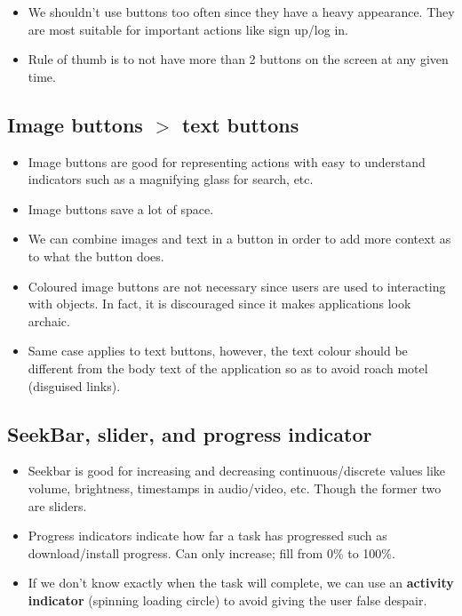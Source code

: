 \documentclass[12pt]{book}
\begin{document}
\begin{itemize}
  \item We shouldn't use buttons too often since they have a heavy appearance. They are most suitable for important actions like sign up/log in.
  \item Rule of thumb is to not have more than 2 buttons on the screen at any given time.
\end{itemize}

\subsection*{Image buttons $>$ text buttons}

\begin{itemize}
  \item Image buttons are good for representing actions with easy to understand indicators such as a magnifying glass for search, etc.
  \item Image buttons save a lot of space.
  \item We can combine images and text in a button in order to add more context as to what the button does.
  \item Coloured image buttons are not necessary since users are used to interacting with objects. In fact, it is discouraged since it makes applications look archaic. 
  \item Same case applies to text buttons, however, the text colour should be different from the body text of the application so as to avoid roach motel (disguised links).
\end{itemize}

\subsection*{SeekBar, slider, and progress indicator}

\begin{itemize}
  \item Seekbar is good for increasing and decreasing continuous/discrete values like volume, brightness, timestamps in audio/video, etc. Though the former two are sliders.
  \item Progress indicators indicate how far a task has progressed such as download/install progress. Can only increase; fill from 0\% to 100\%.
  \item If we don't know exactly when the task will complete, we can use an \textbf{activity indicator} (spinning loading circle) to avoid giving the user false despair.
\end{itemize}
\end{document}

